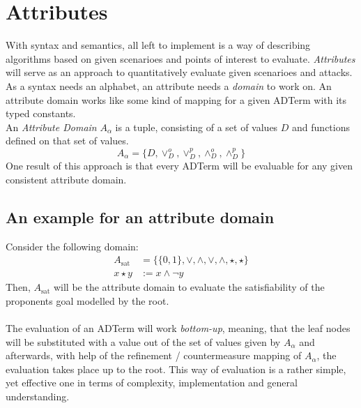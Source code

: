 \documentclass[conference]{IEEEtran}
\begin{document}
\section{Attributes}
With syntax and semantics, all left to implement is a way of describing algorithms based on given scenarioes and points of interest to evaluate. \textit{Attributes} will serve as an approach to quantitatively evaluate given scenarioes and attacks. As a syntax needs an alphabet, an attribute needs a \textit{domain} to work on. An attribute domain works like some kind of mapping for a given ADTerm with its typed constants.\\
An \textit{Attribute Domain} $A_\alpha$ is a tuple, consisting of a set of values $D$ and functions defined on that set of values.
$$A_\alpha = \{D,\vee^o_D,\vee^p_D,\wedge^o_D,\wedge^p_D\}$$
One result of this approach is that every ADTerm will be evaluable for any given consistent attribute domain.
\subsection{An example for an attribute domain}
Consider the following domain:
\begin{align}
A_\text{sat} &= \{ \{0,1\},\vee,\wedge,\vee,\wedge, \star, \star\}\\
x \star y &:= x \wedge \neg y
\end{align}
Then, $A_\text{sat}$ will be the attribute domain to evaluate the satisfiability of the proponents goal modelled by the root.\\\\
The evaluation of an ADTerm will work \textit{bottom-up}, meaning, that the leaf nodes will be substituted with a value out of the set of values given by $A_\alpha$ and afterwards, with help of the refinement / countermeasure mapping of $A_\alpha$, the evaluation takes place up to the root. This way of evaluation is a rather simple, yet effective one in terms of complexity, implementation and general understanding.
\end{document}
